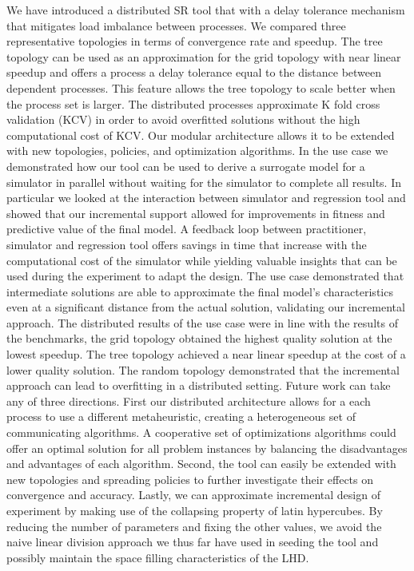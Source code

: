 We have introduced a distributed SR tool that with a delay tolerance mechanism that mitigates load imbalance between processes. We compared three representative topologies in terms of convergence rate and speedup. The tree topology can be used as an approximation for the grid topology with near linear speedup and offers a process a delay tolerance equal to the distance between dependent processes. This feature allows the tree topology to scale better when the process set is larger. The distributed processes approximate K fold cross validation (KCV) in order to avoid overfitted solutions without the high computational cost of KCV. Our modular architecture allows it to be extended with new topologies, policies, and optimization algorithms. 
In the use case we demonstrated how our tool can be used to derive a surrogate model for a simulator in parallel without waiting for the simulator to complete all results. In particular we looked at the interaction between simulator and regression tool and showed that our incremental support allowed for improvements in fitness and predictive value of the final model. A feedback loop between practitioner, simulator and regression tool offers savings in time that increase with the computational cost of the simulator while yielding valuable insights that can be used during the experiment to adapt the design. The use case demonstrated that intermediate solutions are able to approximate the final model's characteristics even at a significant distance from the actual solution, validating our incremental approach. The distributed results of the use case were in line with the results of the benchmarks, the grid topology obtained the highest quality solution at the lowest speedup. The tree topology achieved a near linear speedup at the cost of a lower quality solution. The random topology demonstrated that the incremental approach can lead to overfitting in a distributed setting. 
Future work can take any of three directions. First our distributed architecture allows for a each process to use a different metaheuristic, creating a heterogeneous set of communicating algorithms. A cooperative set of optimizations algorithms could offer an optimal solution for all problem instances by balancing the disadvantages and advantages of each algorithm. 
Second, the tool can easily be extended with new topologies and spreading policies to further investigate their effects on convergence and accuracy. Lastly, we can approximate incremental design of experiment by making use of the collapsing property of latin hypercubes. By reducing the number of parameters and fixing the other values, we avoid the naive linear division approach we thus far have used in seeding the tool and possibly maintain the space filling characteristics of the LHD.
